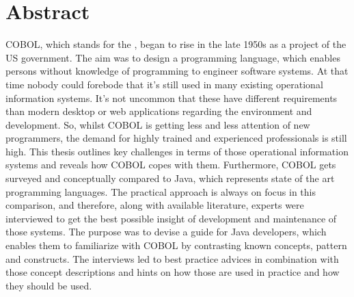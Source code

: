 \chapter*{Abstract} 

COBOL, which stands for the , began to rise in the late 1950s as a project of the US government. The aim was to design a programming language, which enables persons without knowledge of programming to engineer software systems. At that time nobody could forebode that it's still used in many existing operational information systems. It's not uncommon that these have different requirements than modern desktop or web applications regarding the environment and development. So, whilst COBOL is getting less and less attention of new programmers, the demand for highly trained and experienced professionals is still high. This thesis outlines key challenges in terms of those operational information systems and reveals how COBOL copes with them. Furthermore, COBOL gets surveyed and conceptually compared to Java, which represents state of the art programming languages. The practical approach is always on focus in this comparison, and therefore, along with available literature, experts were interviewed to get the best possible insight of development and maintenance of those systems. The purpose was to devise a guide for Java developers, which enables them to familiarize with COBOL by contrasting known concepts, pattern and constructs. The interviews led to best practice advices in combination with those concept descriptions and hints on how those are used in practice and how they should be used.